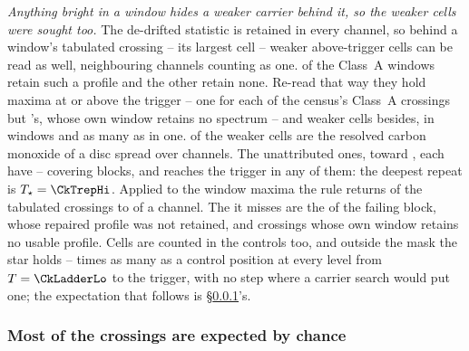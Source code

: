 \emph{Anything bright in a window hides a weaker carrier behind it, so the
weaker cells were sought too.} The de-drifted statistic is retained in every
channel, so behind a window's tabulated crossing -- its largest cell --
weaker above-trigger cells can be read as well, neighbouring channels counting
as one. \CkNWin{} of the \NWinA{} Class~A windows retain such a profile and the
other \CkNWinNotCov{} retain none. Re-read that way they hold \CkNPrimary{}
maxima at or above the trigger -- one for each of the census's
\CkNCrossCenA{} Class~A crossings but \CkMissStar's, whose own window retains
no spectrum -- and \CkNSecondaryWord{} weaker cells besides, in \CkNSecWin{}
windows and as many as \CkNSecMax{} in one. \CkNSecAttr{} of the weaker cells
are the resolved carbon monoxide of a disc spread over channels. The
\CkNSecUnattrWord{} unattributed ones, toward \CkSecStars, each have
\CkCovLo--\CkCovHi{} covering blocks, and \CkNRecurWord{} reaches the trigger
in any of them: the deepest repeat is $T_\star=\CkTrepHi$. Applied to the window maxima the rule returns \CkRegN{} of the
\EvNCrossRaw{} tabulated crossings to \CkRegDev{} of a channel. The
\CkRegMiss{} it misses are the \EvNCrossFlag{} of the failing block, whose
repaired profile was not retained, and crossings whose own window retains no
usable profile.
Cells are counted in the controls too, and outside the mask the star holds
\CkRatioLo--\CkRatioHi{} times as many as a control position at every level
from $T=\CkLadderLo$ to the trigger, with no step where a carrier search would
put one; the expectation that follows is \S\ref{sec:trigunif}'s.

\subsubsection{Most of the crossings are expected by chance}
\label{sec:trigunif}

